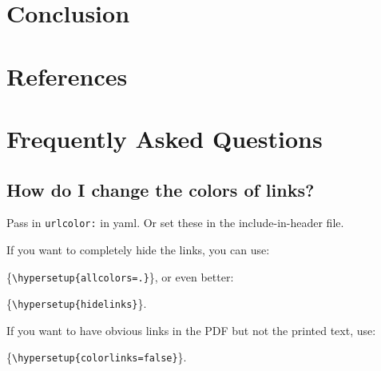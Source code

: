 \documentclass[
  letterpaper,
  11pt,
  english,
  singlespacing,
  headsepline]{MastersDoctoralThesis}
\begin{document}

\chapter{Conclusion}\label{conclusion}


\chapter*{References}\label{references}


\label{refs}

\cleardoublepage
{}
{}
\appendix

\chapter{Frequently Asked Questions}\label{sec-appA}

\section{How do I change the colors of
links?}\label{how-do-i-change-the-colors-of-links}

Pass in \texttt{urlcolor:} in yaml. Or set these in the
include-in-header file.

\noindent If you want to completely hide the links, you can use:

\{\small\verb!\hypersetup{allcolors=.}!\}, or even better:

\{\small\verb!\hypersetup{hidelinks}!\}.

\noindent If you want to have obvious links in the PDF but not the
printed text, use:

\{\small\verb!\hypersetup{colorlinks=false}!\}.
\end{document}
